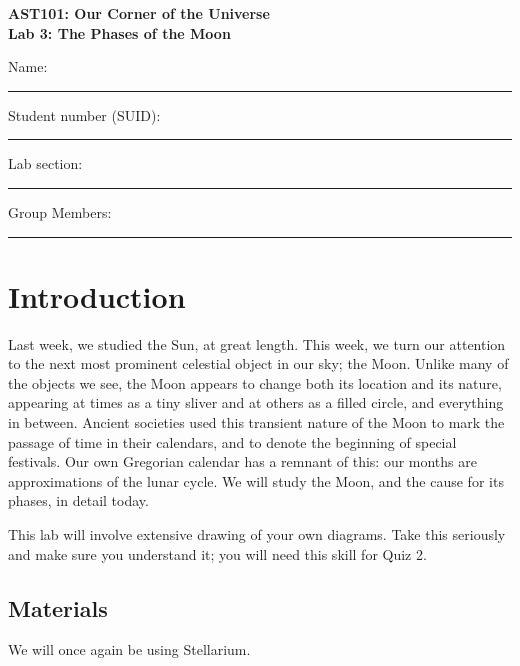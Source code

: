 \documentclass[11pt]{article}
\begin{document}
\begin{center}
\textbf{\Large
AST101: Our Corner of the Universe \\
\vspace*{0.1cm}
Lab 3: The Phases of the Moon
}
\end{center}

\vspace*{0.5cm}

{\Large Name:}\vspace*{0.5cm}\\\hrule
{\Large Student number (SUID):}\vspace*{0.5cm}\\\hrule
{\Large Lab section:}\vspace*{0.5cm}\\\hrule
{\Large Group Members:}\vspace*{0.5cm}\\\hrule
\vspace*{0.5cm}

\section{Introduction}

Last week, we studied the Sun, at great length. This week, we turn our attention to the next most prominent celestial object in our sky; the Moon. Unlike many of the objects we see, the Moon appears to change both its location and its nature, appearing at times as a tiny sliver and at others as a filled circle, and everything in between. Ancient societies used this transient nature of the Moon to mark the passage of time in their calendars, and to denote the beginning of special festivals. Our own Gregorian calendar has a remnant of this: our months are approximations of the lunar cycle. We will study the Moon, and the cause for its phases, in detail today. 

This lab will involve extensive drawing of your own diagrams. Take this seriously and make sure you understand it;
you will need this skill for Quiz 2.

\subsection*{Materials}

We will once again be using Stellarium. 
\end{document}
